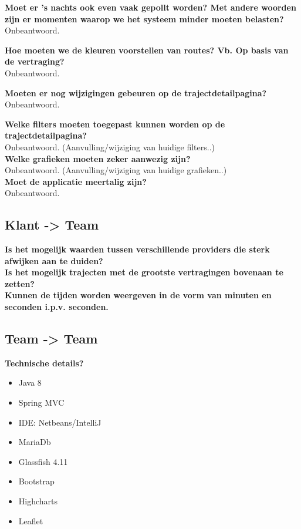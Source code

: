 \documentclass[a4paper]{article}
\begin{document}
\textbf{Moet er ’s nachts ook even vaak gepollt worden? Met andere woorden zijn er momenten waarop we het systeem minder moeten belasten?}\\
Onbeantwoord.

\textbf{Hoe moeten we de kleuren voorstellen van routes? Vb. Op basis van de vertraging?}\\
Onbeantwoord.

\textbf{Moeten er nog wijzigingen gebeuren op de trajectdetailpagina?}\\
Onbeantwoord.

\textbf{Welke filters moeten toegepast kunnen worden op de trajectdetailpagina?}\\
Onbeantwoord. (Aanvulling/wijziging van huidige filters..)\\

\textbf{Welke grafieken moeten zeker aanwezig zijn?}\\
Onbeantwoord. (Aanvulling/wijziging van huidige grafieken..)\\

\textbf{Moet de applicatie meertalig zijn?}\\
Onbeantwoord.

\subsection{Klant -> Team}

\textbf{Is het mogelijk waarden tussen verschillende providers die sterk afwijken aan te duiden?}\\

\textbf{Is het mogelijk trajecten met de grootste vertragingen bovenaan te zetten?}\\

\textbf{Kunnen de tijden worden weergeven in de vorm van minuten en seconden i.p.v. seconden.}\\


\subsection{Team -> Team}

\textbf{Technische details?}\\
\begin{multicols}{2}
\begin{itemize}
\item Java 8
\item Spring MVC
\item IDE: Netbeans/IntelliJ
\item MariaDb
\item Glassfish 4.11
\item Bootstrap
\item Highcharts 
\item Leaflet
\end{itemize}
\end{multicols}
\end{document}
